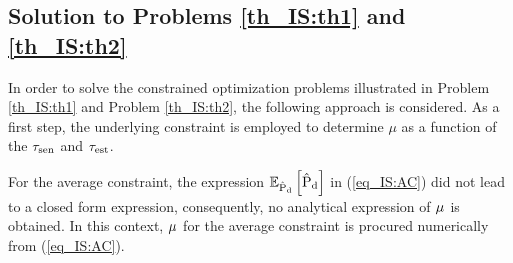 {\subsection{Solution to Problems \ref{th_IS:th1} and \ref{th_IS:th2}} \label{ssec_IS:th1} 
\begin{IEEEproof}[Solution] 
In order to solve the constrained optimization problems illustrated in Problem \ref{th_IS:th1} and Problem \ref{th_IS:th2}, the following approach is considered. As a first step, the underlying constraint is employed to determine $\mu$ as a function of the $\tau_{\text{sen}}$ and $\tau_{\text{est}}$. %

For the average constraint, the expression ${\mathbb E}_{\hat{\text{P}}_{\text{d}}}\left[ \hat{\text{P}}_{\text{d}} \right]$ in (\ref{eq_IS:AC}) did not lead to a closed form expression, consequently, no analytical expression of $\mu^{\text{}}$ is obtained. In this context, $\mu^{\text{}}$ for the average constraint is procured numerically from (\ref{eq_IS:AC}). 


\end{IEEEproof}}
